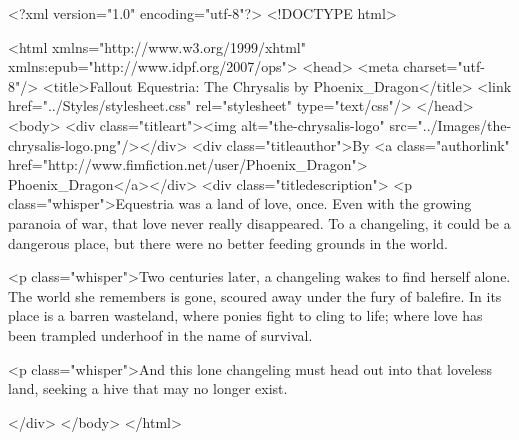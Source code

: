 <?xml version="1.0" encoding="utf-8"?>
<!DOCTYPE html>

<html xmlns="http://www.w3.org/1999/xhtml" xmlns:epub="http://www.idpf.org/2007/ops">
<head>
	<meta charset="utf-8"/>
	<title>Fallout Equestria: The Chrysalis by Phoenix\_Dragon</title>
	<link href="../Styles/stylesheet.css" rel="stylesheet" type="text/css"/>
</head>
<body>
	<div class="titleart"><img alt="the-chrysalis-logo" src="../Images/the-chrysalis-logo.png"/></div>
	<div class="titleauthor">By <a class="authorlink" href="http://www.fimfiction.net/user/Phoenix\_Dragon"> Phoenix\_Dragon</a></div>
	<div class="titledescription">
		<p class="whisper">Equestria was a land of love, once. Even with the growing paranoia of war, that love never really disappeared. To a changeling, it could be a dangerous place, but there were no better feeding grounds in the world.

		<p class="whisper">Two centuries later, a changeling wakes to find herself alone. The world she remembers is gone, scoured away under the fury of balefire. In its place is a barren wasteland, where ponies fight to cling to life; where love has been trampled underhoof in the name of survival.

		<p class="whisper">And this lone changeling must head out into that loveless land, seeking a hive that may no longer exist.

	</div>
</body>
</html>